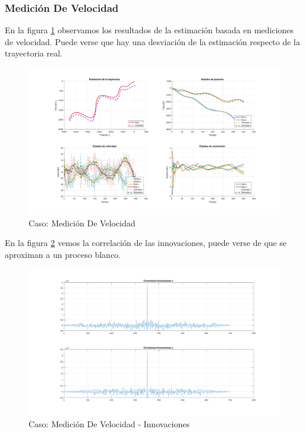		\subsubsection{Medición De Velocidad}
		
		En la figura \ref{fig:ej2b} observamos los resultados de la estimación basada en mediciones de velocidad. Puede verse que hay una desviación de la estimación respecto de la trayectoria real.
		
		\begin{figure}[H]
			\centering
			\includegraphics[width=1.0\textwidth,keepaspectratio]{Figuras/graf_ej2b.pdf}
			\caption{Caso: Medición De Velocidad}
			\label{fig:ej2b}
		\end{figure}
		
		En la figura \ref{fig:ej2b_innov} vemos la correlación de las innovaciones, puede verse de que se aproximan a un proceso blanco.
		
		\begin{figure}[H]
			\centering
			\includegraphics[width=1.0\textwidth,keepaspectratio]{Figuras/covinn_ej2b.pdf} \caption{Caso: Medición De Velocidad - Innovaciones} \label{fig:ej2b_innov}
		\end{figure}
			

